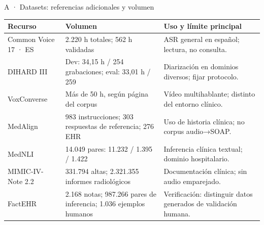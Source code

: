 \documentclass[aspectratio=169,10pt]{beamer}
\begin{document}
\appendix
\inappendixtrue
{}
\begin{frame}[noframenumbering]{A · Datasets: referencias adicionales y volumen}
  {\fontsize{8}{10}\selectfont\renewcommand{\arraystretch}{1.05}
  \begin{tabularx}{\textwidth}{L{2.5cm}L{4.5cm}X}
    \toprule \textbf{Recurso} & \textbf{Volumen} & \textbf{Uso y límite principal}\\\midrule
    Common Voice 17 · ES & 2.220 h totales; 562 h validadas & ASR general en español; lectura, no consulta.\\
    DIHARD III & Dev: 34,15 h / 254 grabaciones; eval: 33,01 h / 259 & Diarización en dominios diversos; fijar protocolo.\\
    VoxConverse & Más de 50 h, según página del corpus & Vídeo multihablante; distinto del entorno clínico.\\
    MedAlign & 983 instrucciones; 303 respuestas de referencia; 276 EHR & Uso de historia clínica; no corpus audio→SOAP.\\
    MedNLI & 14.049 pares: 11.232 / 1.395 / 1.422 & Inferencia clínica textual; dominio hospitalario.\\
    MIMIC-IV-Note 2.2 & 331.794 altas; 2.321.355 informes radiológicos & Documentación clínica; sin audio emparejado.\\
    FactEHR & 2.168 notas; 987.266 pares de inferencia; 1.036 ejemplos humanos & Verificación: distinguir datos generados de validación humana.\\
    \bottomrule
  \end{tabularx}}
\end{frame}
\end{document}

